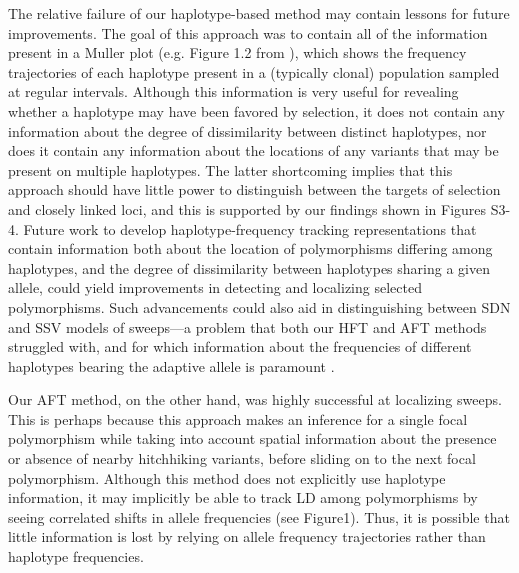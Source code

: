 The relative failure of our haplotype-based method may contain lessons for future improvements. The goal of this approach was to contain all of the information present in a Muller plot (e.g. Figure 1.2 from \cite{herronParallelEvolutionaryDynamics2013}), which shows the frequency trajectories of each haplotype present in a (typically clonal) population sampled at regular intervals. Although this information is very useful for revealing whether a haplotype may have been favored by selection, it does not contain any information about the degree of dissimilarity between distinct haplotypes, nor does it contain any information about the locations of any variants that may be present on multiple haplotypes. The latter shortcoming implies that this approach should have little power to distinguish between the targets of selection and closely linked loci, and this is supported by our findings shown in Figures S3-4. Future work to develop haplotype-frequency tracking representations that contain information both about the location of polymorphisms differing among haplotypes, and the degree of dissimilarity between haplotypes sharing a given allele, could yield improvements in detecting and localizing selected polymorphisms. Such advancements could also aid in distinguishing between SDN and SSV models of sweeps—a problem that both our HFT and AFT methods struggled with, and for which information about the frequencies of different haplotypes bearing the adaptive allele is paramount \cite{garudRecentSelectiveSweeps2015}.

Our AFT method, on the other hand, was highly successful at localizing sweeps. This is perhaps because this approach makes an inference for a single focal polymorphism while taking into account spatial information about the presence or absence of nearby hitchhiking variants, before sliding on to the next focal polymorphism. Although this method does not explicitly use haplotype information, it may implicitly be able to track LD among polymorphisms by seeing correlated shifts in allele frequencies (see Figure1). Thus, it is possible that little information is lost by relying on allele frequency trajectories rather than haplotype frequencies.


